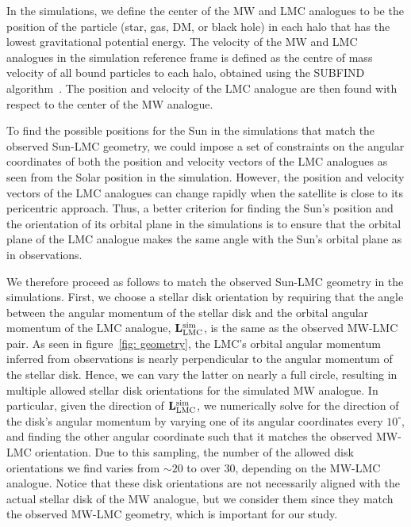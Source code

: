  In the simulations, we define the center of the MW and LMC analogues to be the position of the particle (star, gas, DM, or black hole) in each halo that has the lowest gravitational potential energy. The velocity of the MW and LMC analogues in the simulation reference frame is defined as  the centre of mass velocity of all bound particles to each halo, obtained using the SUBFIND algorithm~\cite{Springel:2000qu}. The position and velocity of the LMC analogue are then found with respect to the center of the MW analogue.


To find the possible positions for the Sun in the simulations that match the observed Sun-LMC geometry, we could impose a set of constraints on the angular coordinates of both the position and velocity vectors of the LMC analogues as seen from the Solar position in the simulation. However, the position and velocity vectors of the LMC analogues can change rapidly when the satellite is close to its pericentric approach. Thus, a better criterion for finding the Sun's position and the orientation of its orbital plane in the simulations is to ensure that the orbital plane of the LMC analogue makes the same angle with the Sun's orbital plane  as in observations.


We therefore proceed as follows to match the observed Sun-LMC geometry in the simulations. First, we choose a stellar disk orientation by requiring that the angle between the  angular momentum of the stellar disk and the orbital angular momentum of the LMC analogue, ${\bf L}_{\rm LMC}^{\rm sim}$, is the same as the observed MW-LMC pair. As seen in figure~\ref{fig: geometry}, the LMC's orbital angular momentum inferred from observations is nearly perpendicular to the angular momentum of the stellar disk. Hence, we can vary the latter on nearly  a full circle, resulting in multiple allowed stellar disk orientations for the simulated MW analogue. In particular, given the direction of ${\bf L}_{\rm LMC}^{\rm sim}$, we numerically solve for the direction of the disk's angular momentum by varying one of its angular coordinates every $10^\circ$, and finding the other angular coordinate such that it matches the observed MW-LMC orientation. Due to this sampling, the number of the allowed disk orientations we find varies from $\sim 20$ to over 30, depending on the MW-LMC analogue. Notice that these disk orientations are not necessarily aligned with the actual stellar disk of the MW analogue, but we consider them since they match the observed MW-LMC geometry, which is important for our study. 

